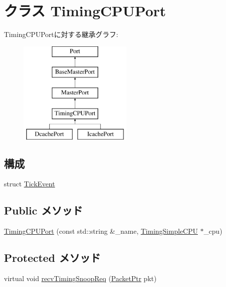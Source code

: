 \hypertarget{classTimingSimpleCPU_1_1TimingCPUPort}{
\section{クラス TimingCPUPort}
\label{classTimingSimpleCPU_1_1TimingCPUPort}
}
TimingCPUPortに対する継承グラフ:\begin{figure}[H]
\begin{center}
\leavevmode
\includegraphics[height=5cm]{classTimingSimpleCPU_1_1TimingCPUPort}
\end{center}
\end{figure}
\subsection*{構成}
\begin{DoxyCompactItemize}
\item 
struct \hyperlink{structTimingSimpleCPU_1_1TimingCPUPort_1_1TickEvent}{TickEvent}
\end{DoxyCompactItemize}
\subsection*{Public メソッド}
\begin{DoxyCompactItemize}
\item 
\hyperlink{classTimingSimpleCPU_1_1TimingCPUPort_a5c5d45da58c60de7b1896dbc5440d644}{TimingCPUPort} (const std::string \&\_\-name, \hyperlink{classTimingSimpleCPU_1_1TimingSimpleCPU}{TimingSimpleCPU} $\ast$\_\-cpu)
\end{DoxyCompactItemize}
\subsection*{Protected メソッド}
\begin{DoxyCompactItemize}
\item 
virtual void \hyperlink{classTimingSimpleCPU_1_1TimingCPUPort_ae43c73eff109f907118829fcfa9e7096}{recvTimingSnoopReq} (\hyperlink{classPacket}{PacketPtr} pkt)
\end{DoxyCompactItemize}
